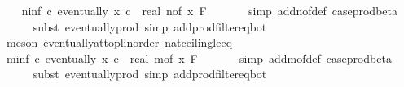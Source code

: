 \begin{isabellebody}
\isanewline
\ \ \isamarkupfalse%
\ n{\isacharunderscore}{\kern0pt}inf{\isacharcolon}{\kern0pt}\ {\isachardoublequoteopen}{\isasymAnd}c{\isachardot}{\kern0pt}\ eventually\ {\isacharparenleft}{\kern0pt}{\isasymlambda}x{\isachardot}{\kern0pt}\ c\ {\isasymle}\ {\isacharparenleft}{\kern0pt}real\ {\isacharparenleft}{\kern0pt}n{\isacharunderscore}{\kern0pt}of\ x{\isacharparenright}{\kern0pt}{\isacharparenright}{\kern0pt}{\isacharparenright}{\kern0pt}\ {\isacharquery}{\kern0pt}F{\isachardoublequoteclose}\ \isanewline
\ \ \ \ \isamarkupfalse%
\ {\isacharparenleft}{\kern0pt}simp\ add{\isacharcolon}{\kern0pt}n{\isacharunderscore}{\kern0pt}of{\isacharunderscore}{\kern0pt}def\ case{\isacharunderscore}{\kern0pt}prod{\isacharunderscore}{\kern0pt}beta{\isacharprime}{\kern0pt}{\isacharparenright}{\kern0pt}\isanewline
\ \ \ \ \isamarkupfalse%
\ {\isacharparenleft}{\kern0pt}subst\ eventually{\isacharunderscore}{\kern0pt}prod{}{\isacharprime}{\kern0pt}{\isacharcomma}{\kern0pt}\ simp\ add{\isacharcolon}{\kern0pt}prod{\isacharunderscore}{\kern0pt}filter{\isacharunderscore}{\kern0pt}eq{\isacharunderscore}{\kern0pt}bot{\isacharparenright}{\kern0pt}\isanewline
\ \ \ \ \isamarkupfalse%
\ {\isacharparenleft}{\kern0pt}meson\ eventually{\isacharunderscore}{\kern0pt}at{\isacharunderscore}{\kern0pt}top{\isacharunderscore}{\kern0pt}linorder\ nat{\isacharunderscore}{\kern0pt}ceiling{\isacharunderscore}{\kern0pt}le{\isacharunderscore}{\kern0pt}eq{\isacharparenright}{\kern0pt}\isanewline
\isanewline
\ \ \isamarkupfalse%
\ m{\isacharunderscore}{\kern0pt}inf{\isacharcolon}{\kern0pt}\ {\isachardoublequoteopen}{\isasymAnd}c{\isachardot}{\kern0pt}\ eventually\ {\isacharparenleft}{\kern0pt}{\isasymlambda}x{\isachardot}{\kern0pt}\ c\ {\isasymle}\ {\isacharparenleft}{\kern0pt}real\ {\isacharparenleft}{\kern0pt}m{\isacharunderscore}{\kern0pt}of\ x{\isacharparenright}{\kern0pt}{\isacharparenright}{\kern0pt}{\isacharparenright}{\kern0pt}\ {\isacharquery}{\kern0pt}F{\isachardoublequoteclose}\ \isanewline
\ \ \ \ \isamarkupfalse%
\ {\isacharparenleft}{\kern0pt}simp\ add{\isacharcolon}{\kern0pt}m{\isacharunderscore}{\kern0pt}of{\isacharunderscore}{\kern0pt}def\ case{\isacharunderscore}{\kern0pt}prod{\isacharunderscore}{\kern0pt}beta{\isacharprime}{\kern0pt}{\isacharparenright}{\kern0pt}\isanewline
\ \ \ \ \isamarkupfalse%
\ {\isacharparenleft}{\kern0pt}subst\ eventually{\isacharunderscore}{\kern0pt}prod{}{\isacharprime}{\kern0pt}{\isacharcomma}{\kern0pt}\ simp\ add{\isacharcolon}{\kern0pt}prod{\isacharunderscore}{\kern0pt}filter{\isacharunderscore}{\kern0pt}eq{\isacharunderscore}{\kern0pt}bot{\isacharparenright}{\kern0pt}\isanewline

\end{isabellebody}
